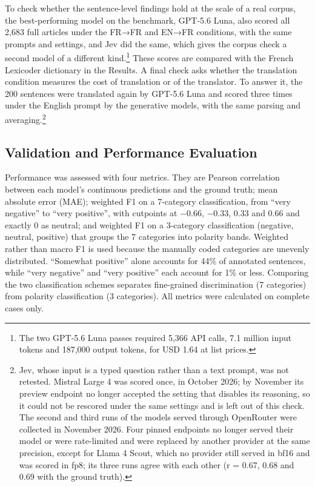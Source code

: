 \documentclass[
  man,
  floatsintext,
  longtable,
  nolmodern,
  notxfonts,
  notimes,
  colorlinks=true,linkcolor=blue,citecolor=blue,urlcolor=blue]{apa7}
\begin{document}
To check whether the sentence-level findings hold at the scale of a real
corpus, the best-performing model on the benchmark, GPT-5.6 Luna, also
scored all 2,683 full articles under the FR→FR and EN→FR conditions,
with the same prompts and settings, and Jev did the same, which gives
the corpus check a second model of a different kind.\footnote{The two
  GPT-5.6 Luna passes required 5,366 API calls, 7.1 million input tokens
  and 187,000 output tokens, for USD 1.64 at list prices.} These scores
are compared with the French Lexicoder dictionary in the Results. A
final check asks whether the translation condition measures the cost of
translation or of the translator. To answer it, the 200 sentences were
translated again by GPT-5.6 Luna and scored three times under the
English prompt by the generative models, with the same parsing and
averaging.\footnote{Jev, whose input is a typed question rather than a
  text prompt, was not retested. Mistral Large 4 was scored once, in
  October 2026; by November its preview endpoint no longer accepted the
  setting that disables its reasoning, so it could not be rescored under
  the same settings and is left out of this check. The second and third
  runs of the models served through OpenRouter were collected in
  November 2026. Four pinned endpoints no longer served their model or
  were rate-limited and were replaced by another provider at the same
  precision, except for Llama 4 Scout, which no provider still served in
  bf16 and was scored in fp8; its three runs agree with each other (r =
  0.67, 0.68 and 0.69 with the ground truth).}

\subsection{Validation and Performance
Evaluation}\label{validation-and-performance-evaluation}

Performance was assessed with four metrics. They are Pearson correlation
between each model's continuous predictions and the ground truth; mean
absolute error (MAE); weighted F1 on a 7-category classification, from
``very negative'' to ``very positive'', with cutpoints at −0.66, −0.33,
0.33 and 0.66 and exactly 0 as neutral; and weighted F1 on a 3-category
classification (negative, neutral, positive) that groups the 7
categories into polarity bands. Weighted rather than macro F1 is used
because the manually coded categories are unevenly distributed.
``Somewhat positive'' alone accounts for 44\% of annotated sentences,
while ``very negative'' and ``very positive'' each account for 1\% or
less. Comparing the two classification schemes separates fine-grained
discrimination (7 categories) from polarity classification (3
categories). All metrics were calculated on complete cases only.
\end{document}
